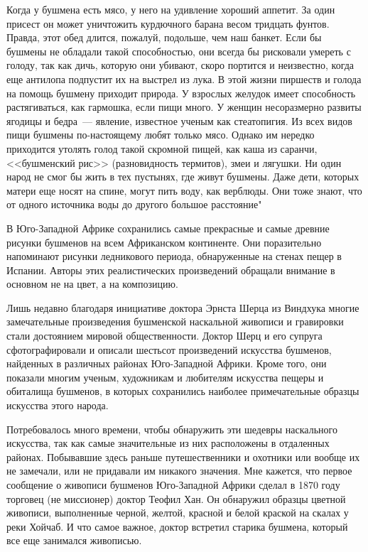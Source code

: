 \documentclass[12pt,a4paper,twoside,openany,svgnames]{memoir}
\begin{document}
Когда у бушмена есть мясо, у него на удивление хороший аппетит. За один присест он может уничтожить курдючного барана весом тридцать фунтов. Правда, этот обед длится, пожалуй, подольше, чем наш банкет. Если бы бушмены не обладали такой способностью, они всегда бы рисковали умереть с голоду, так как дичь, которую они убивают, скоро портится и неизвестно, когда еще антилопа подпустит их на выстрел из лука. В этой жизни пиршеств и голода на помощь бушмену приходит природа. У взрослых желудок имеет способность растягиваться, как гармошка, если пищи много. У женщин несоразмерно развиты ягодицы и бедра~--- явление, известное ученым как стеатопигия. Из всех видов пищи бушмены по-настоящему любят только мясо. Однако им нередко приходится утолять голод такой скромной пищей, как каша из саранчи, <<бушменский рис>> (разновидность термитов), змеи и лягушки. Ни один народ не смог бы жить в тех пустынях, где живут бушмены. Даже дети, которых матери еще носят на спине, могут пить воду, как верблюды. Они тоже знают, что от одного источника воды до другого большое расстояние"

В Юго-Западной Африке сохранились самые прекрасные и самые древние рисунки бушменов на всем Африканском континенте. Они поразительно напоминают рисунки ледникового периода, обнаруженные на стенах пещер в Испании. Авторы этих реалистических произведений обращали внимание в основном не на цвет, а на композицию.

Лишь недавно благодаря инициативе доктора Эрнста Шерца из Виндхука многие замечательные произведения бушменской наскальной живописи и гравировки стали достоянием мировой общественности. Доктор Шерц и его супруга сфотографировали и описали шестьсот произведений искусства бушменов, найденных в различных районах Юго-Западной Африки. Кроме того, они показали многим ученым, художникам и любителям искусства пещеры и обиталища бушменов, в которых сохранились наиболее примечательные образцы искусства этого народа.

Потребовалось много времени, чтобы обнаружить эти шедевры наскального искусства, так как самые значительные из них расположены в отдаленных районах. Побывавшие здесь раньше путешественники и охотники или вообще их не замечали, или не придавали им никакого значения. Мне кажется, что первое сообщение о живописи бушменов Юго-Западной Африки сделал в 1870 году торговец (не миссионер) доктор Теофил Хан. Он обнаружил образцы цветной живописи, выполненные черной, желтой, красной и белой краской на скалах у реки Хойчаб. И что самое важное, доктор встретил старика бушмена, который все еще занимался живописью.
\end{document}
